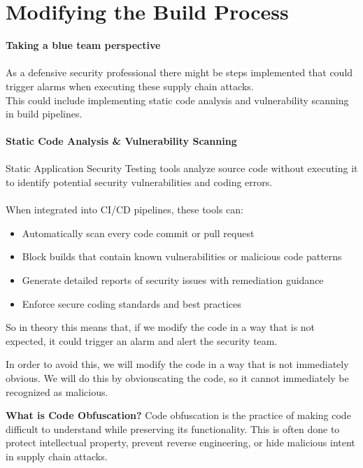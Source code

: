\documentclass[12pt]{scrartcl}
\newenvironment{hintbox}{%
    \def\FrameCommand{\fboxsep=\FrameSep\colorbox{hintgreen!20}}%
    \MakeFramed {\advance\hsize-\width \FrameRestore}}%
    {\endMakeFramed}
\begin{document}
    \newpage

    \section{Modifying the Build Process}

    \noindent
    \textbf{Taking a blue team perspective} \\
    \\
    \noindent
    As a defensive security professional there might be steps implemented that could trigger alarms when executing these supply chain attacks. \\
    This could include implementing static code analysis and vulnerability scanning in build pipelines. \\
    \\
    \noindent
    \textbf{Static Code Analysis \& Vulnerability Scanning} \\
    \\
    \noindent
    Static Application Security Testing tools analyze source code without executing it to identify potential security vulnerabilities and coding errors. \\
    \\
    When integrated into CI/CD pipelines, these tools can:
    
    \begin{itemize}
        \item Automatically scan every code commit or pull request
        \item Block builds that contain known vulnerabilities or malicious code patterns
        \item Generate detailed reports of security issues with remediation guidance
        \item Enforce secure coding standards and best practices
    \end{itemize}
    \noindent
    So in theory this means that, if we modify the code in a way that is not expected, it could trigger an alarm and alert the security team.

    \noindent
    In order to avoid this, we will modify the code in a way that is not immediately obvious. We will do this by obviouscating the code, so it cannot immediately be recognized as malicious.

    \begin{hintbox}
    \noindent
    \textbf{What is Code Obfuscation?}
    \noindent
    Code obfuscation is the practice of making code difficult to understand while preserving its functionality.
    This is often done to protect intellectual property, prevent reverse engineering, or hide malicious intent in supply chain attacks.
    \end{hintbox}
\end{document}
